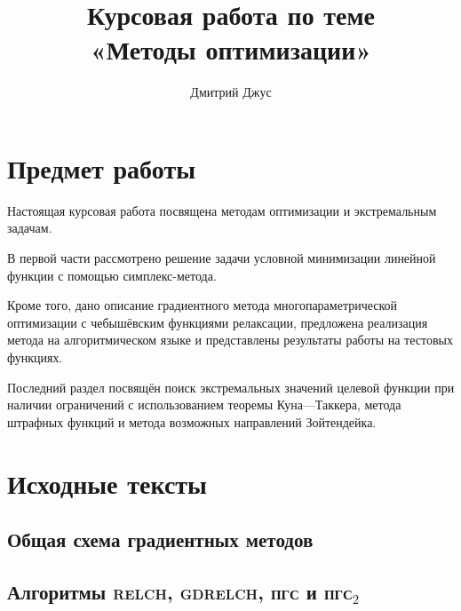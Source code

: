 \documentclass{article}
\newcommand{\relch}{\textsc{relch}}
\newcommand{\gdrelch}{\textsc{gdrelch}}
\newcommand{\gd}{\textsc{пгс}}
\newcommand{\rgd}{\textsc{пгс}$_2$}
\theoremstyle{ruthm}
\numberwithin{thm}{section}
\theoremstyle{rurem}
\theoremstyle{rudfn}
\numberwithin{equation}{section}
\begin{document}
\author{Дмитрий Джус}
\title{Курсовая работа по теме \\
  \Huge{«Методы оптимизации»}}
\pretitle{\begin{center}\LARGE}
\posttitle{\par\end{center}\vskip 3pc}
\date{}
\maketitle
\thispagestyle{empty}

\clearpage
\tableofcontents

\clearpage
\listoffigures

\clearpage
\section{Предмет работы}

Настоящая курсовая работа посвящена методам оптимизации и
экстремальным задачам.

В первой части рассмотрено решение задачи условной минимизации
линейной функции с помощью симплекс-метода.

Кроме того, дано описание градиентного метода многопараметрической
оптимизации с чебышёвским функциями релаксации, предложена реализация
метода на алгоритмическом языке и представлены результаты работы на
тестовых функциях.

Последний раздел посвящён поиск экстремальных значений целевой функции
при наличии ограничений с использованием теоремы Куна—Таккера, метода
штрафных функций и метода возможных направлений Зойтендейка.

\clearpage


\clearpage


\clearpage


\clearpage


\clearpage
\appendix
\section{Исходные тексты}
\label{sec:sources}

\subsection{Общая схема градиентных методов}


\subsection{Алгоритмы \relch{}, \gdrelch{}, \gd{} и \rgd{}}

\end{document}
